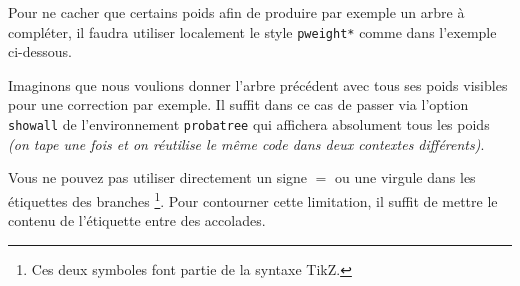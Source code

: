 \documentclass[12pt,a4paper]{article}
\begin{document}





Pour ne cacher que certains poids afin de produire par exemple un arbre à compléter, il faudra utiliser localement le style \verb+pweight*+ comme dans l'exemple ci-dessous.






Imaginons que nous voulions donner l'arbre précédent avec tous ses poids visibles pour une correction par exemple.
Il suffit dans ce cas de passer via l'option \verb#showall# de l'environnement \verb+probatree+ qui affichera absolument tous les poids \emph{(on tape une fois et on réutilise le même code dans deux contextes différents)}.






Vous ne pouvez pas utiliser directement un signe $=$ ou une virgule dans les étiquettes des branches
\footnote{
	Ces deux symboles font partie de la syntaxe TikZ.
}.
Pour contourner cette limitation, il suffit de mettre le contenu de l'étiquette entre des accolades.

\end{document}

